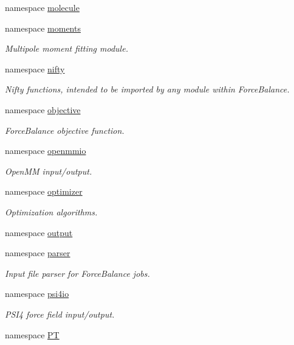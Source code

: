 \begin{DoxyCompactItemize}
namespace \hyperlink{namespaceforcebalance_1_1molecule}{molecule}
\item 
namespace \hyperlink{namespaceforcebalance_1_1moments}{moments}
\begin{DoxyCompactList}\small\item\em \-Multipole moment fitting module. \end{DoxyCompactList}\item 
namespace \hyperlink{namespaceforcebalance_1_1nifty}{nifty}
\begin{DoxyCompactList}\small\item\em \-Nifty functions, intended to be imported by any module within \-Force\-Balance. \end{DoxyCompactList}\item 
namespace \hyperlink{namespaceforcebalance_1_1objective}{objective}
\begin{DoxyCompactList}\small\item\em \-Force\-Balance objective function. \end{DoxyCompactList}\item 
namespace \hyperlink{namespaceforcebalance_1_1openmmio}{openmmio}
\begin{DoxyCompactList}\small\item\em \-Open\-M\-M input/output. \end{DoxyCompactList}\item 
namespace \hyperlink{namespaceforcebalance_1_1optimizer}{optimizer}
\begin{DoxyCompactList}\small\item\em \-Optimization algorithms. \end{DoxyCompactList}\item 
namespace \hyperlink{namespaceforcebalance_1_1output}{output}
\item 
namespace \hyperlink{namespaceforcebalance_1_1parser}{parser}
\begin{DoxyCompactList}\small\item\em \-Input file parser for \-Force\-Balance jobs. \end{DoxyCompactList}\item 
namespace \hyperlink{namespaceforcebalance_1_1psi4io}{psi4io}
\begin{DoxyCompactList}\small\item\em \-P\-S\-I4 force field input/output. \end{DoxyCompactList}\item 
namespace \hyperlink{namespaceforcebalance_1_1PT}{\-P\-T}

\end{DoxyCompactItemize}
